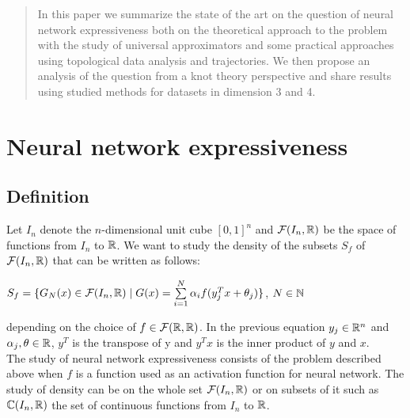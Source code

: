 \documentclass[12pt, a4paper]{article}
\begin{document}
\newpage
\maketitle
\begin{abstract}
  In this paper we summarize the state of the art on the question of neural network expressiveness both on the theoretical approach to the problem with the study of universal approximators and some practical approaches using topological data analysis and trajectories. We then propose an analysis of the question from a knot theory perspective and share results using studied methods for datasets in dimension 3 and 4.
\end{abstract}

\newpage

\tableofcontents

\newpage

\listoffigures

\newpage

\section{Neural network expressiveness}

\subsection{Definition}

Let $I_n$ denote the $n$-dimensional unit cube $[0,1]^n$ and $\mathcal{F}(I_n,\mathbb{R})$ be the space of functions from $I_n$ to $\mathbb{R}$. We want to study the density of the subsets $S_f$ of $\mathcal{F}(I_n,\mathbb{R})$ that can be written as follows:\\

\begin{center}
  $S_f = \{G_N(x) \in \mathcal{F}(I_n,\mathbb{R}) \mid G(x) = \sum\limits_{i=1}^{N} \alpha_i f(y_j^T x + \theta_j )\}$, $N \in \mathbb{N} $
\end{center}

depending on the choice of $f \in \mathcal{F}(\mathbb{R},\mathbb{R})$. In the previous equation $y_j \in \mathbb{R}^n$ and $\alpha_j, \theta \in \mathbb{R}$, $y^T$ is the transpose of y and $y^Tx$ is the inner product of $y$ and $x$.\\

The study of neural network expressiveness consists of the problem described above when $f$ is a function used as an activation function for neural network. The study of density can be on the whole set $\mathcal{F}(I_n,\mathbb{R})$ or on subsets of it such as $\mathbb{C}(I_n,\mathbb{R})$ the set of continuous functions from $I_n$ to $\mathbb{R}$.\\
\end{document}
